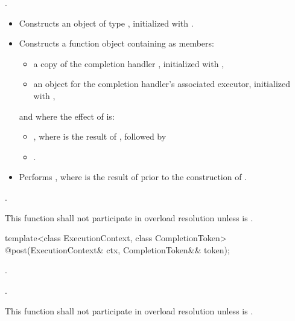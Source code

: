 \begin{itemdescr}
\pnum
\completionsig {}.

\pnum
\effects
\begin{itemize}
\item
 Constructs an object  of type , initialized with .
\item
 Constructs a function object  containing as members:
\begin{itemize}
\item
a copy of the completion handler , initialized with ,
\item
an  object  for the completion handler's associated executor, initialized with ,
\end{itemize}
and where the effect of  is:
\begin{itemize}
\item
{}, where  is the result of , followed by
\item
{}.
\end{itemize}
\item
 Performs , where  is the result of  prior to the construction of .
\end{itemize}

\pnum
\returns {}.

\pnum
\remarks This function shall not participate in overload resolution unless
 is .
\end{itemdescr}

\begin{itemdecl}
template<class ExecutionContext, class CompletionToken>
  @\DEDUCED@ post(ExecutionContext& ctx, CompletionToken&& token);
\end{itemdecl}

\begin{itemdescr}
\pnum
\completionsig {}.

\pnum
\returns {}.

\pnum
\remarks This function shall not participate in overload resolution
unless  is .
\end{itemdescr}



